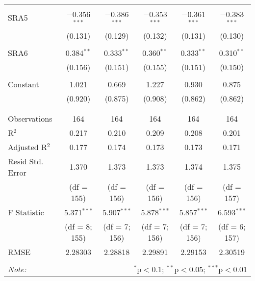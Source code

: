 \begin{table}[H]
\begin{adjustbox}{width=\textwidth}
\begin{tabular}{@{\extracolsep{5pt}}lccccc}
  & & & & & \\ 
 SRA5 & $-$0.356$^{***}$ & $-$0.386$^{***}$ & $-$0.353$^{***}$ & $-$0.361$^{***}$ & $-$0.383$^{***}$ \\ 
  & (0.131) & (0.129) & (0.132) & (0.131) & (0.130) \\ 
  & & & & & \\ 
 SRA6 & 0.384$^{**}$ & 0.333$^{**}$ & 0.360$^{**}$ & 0.333$^{**}$ & 0.310$^{**}$ \\ 
  & (0.156) & (0.151) & (0.155) & (0.151) & (0.150) \\ 
  & & & & & \\ 
 Constant & 1.021 & 0.669 & 1.227 & 0.930 & 0.875 \\ 
  & (0.920) & (0.875) & (0.908) & (0.862) & (0.862) \\ 
  & & & & & \\ 
\hline \\[-1.8ex] 
Observations & 164 & 164 & 164 & 164 & 164 \\ 
R$^{2}$ & 0.217 & 0.210 & 0.209 & 0.208 & 0.201 \\ 
Adjusted R$^{2}$ & 0.177 & 0.174 & 0.173 & 0.173 & 0.171 \\ 
Resid Std. Error & 1.370  & 1.373 & 1.373  & 1.374  & 1.375 \\ 
& (df = 155) & (df = 156) & (df = 156) & (df = 156) & (df = 157) \\
F Statistic & 5.371$^{***}$  & 5.907$^{***}$  & 5.878$^{***}$  & 5.857$^{***}$  & 6.593$^{***}$  \\
& (df = 8; 155) & (df = 7; 156) & (df = 7; 156) & (df = 7; 156) & (df = 6; 157) \\
RMSE & 2.28303 & 2.28818 & 2.29891 & 2.29153 & 2.30519 \\
\hline 
\hline \\[-1.8ex] 
\textit{Note:}  & \multicolumn{5}{r}{$^{*}$p$<$0.1; $^{**}$p$<$0.05; $^{***}$p$<$0.01} \\ 
\end{tabular} 
\end{adjustbox}
\end{table} 

